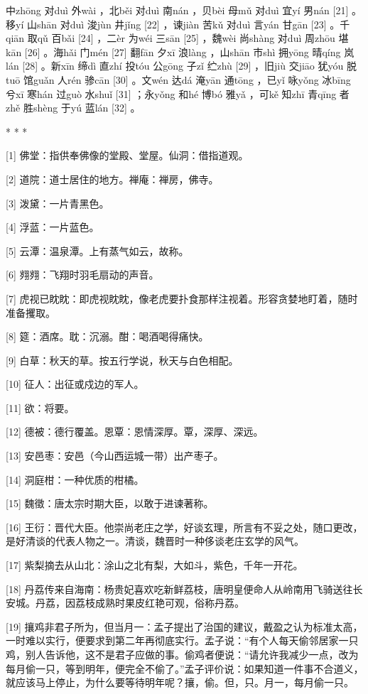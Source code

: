\documentclass[12pt,UTF8]{ctexbook}
\begin{document}
中zhōng 对duì 外wài ，北běi 对duì 南nán ，贝bèi 母mǔ 对duì 宜yí 男nán [21] 。移yí 山shān 对duì 浚jùn 井jǐng [22] ，谏jiàn 苦kǔ 对duì 言yán 甘gān [23] 。千qiān 取qǔ 百bǎi [24] ，二èr 为wéi 三sān [25] ，魏wèi 尚shàng 对duì 周zhōu 堪kān [26] 。海hǎi 门mén [27] 翻fān 夕xī 浪làng ，山shān 市shì 拥yōng 晴qíng 岚lán [28] 。新xīn 缔dì 直zhí 投tóu 公gōng 子zǐ 纻zhù [29] ，旧jiù 交jiāo 犹yóu 脱tuō 馆guǎn 人rén 骖cān [30] 。文wén 达dá 淹yān 通tōng ，已yǐ 咏yǒng 冰bīng 兮xī 寒hán 过guò 水shuǐ [31] ；永yǒng 和hé 博bó 雅yǎ ，可kě 知zhī 青qīng 者zhě 胜shèng 于yú 蓝lán [32] 。



* * *



[1] 佛堂：指供奉佛像的堂殿、堂屋。仙洞：借指道观。

[2] 道院：道士居住的地方。禅庵：禅房，佛寺。

[3] 泼黛：一片青黑色。

[4] 浮蓝：一片蓝色。

[5] 云潭：温泉潭。上有蒸气如云，故称。

[6] 翙翙：飞翔时羽毛扇动的声音。

[7] 虎视已眈眈：即虎视眈眈，像老虎要扑食那样注视着。形容贪婪地盯着，随时准备攫取。

[8] 筵：酒席。耽：沉溺。酣：喝酒喝得痛快。

[9] 白草：秋天的草。按五行学说，秋天与白色相配。

[10] 征人：出征或戍边的军人。

[11] 欲：将要。

[12] 德被：德行覆盖。恩覃：恩情深厚。覃，深厚、深远。

[13] 安邑枣：安邑（今山西运城一带）出产枣子。

[14] 洞庭柑：一种优质的柑橘。

[15] 魏徵：唐太宗时期大臣，以敢于进谏著称。

[16] 王衍：晋代大臣。他崇尚老庄之学，好谈玄理，所言有不妥之处，随口更改，是好清谈的代表人物之一。清谈，魏晋时一种侈谈老庄玄学的风气。

[17] 紫梨摘去从山北：涂山之北有梨，大如斗，紫色，千年一开花。

[18] 丹荔传来自海南：杨贵妃喜欢吃新鲜荔枝，唐明皇便命人从岭南用飞骑送往长安城。丹荔，因荔枝成熟时果皮红艳可观，俗称丹荔。

[19] 攘鸡非君子所为，但当月一：孟子提出了治国的建议，戴盈之认为标准太高，一时难以实行，便要求到第二年再彻底实行。孟子说：“有个人每天偷邻居家一只鸡，别人告诉他，这不是君子应做的事。偷鸡者便说：“请允许我减少一点，改为每月偷一只，等到明年，便完全不偷了。”孟子评价说：如果知道一件事不合道义，就应该马上停止，为什么要等待明年呢？攘，偷。但，只。月一，每月偷一只。
\end{document}
